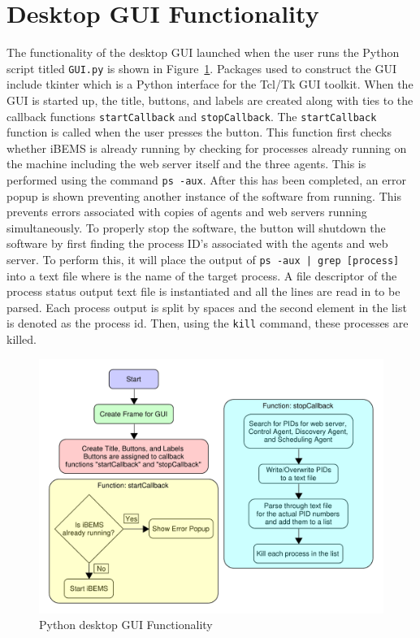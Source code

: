 \section{Desktop GUI Functionality}
The functionality of the desktop GUI launched when the user runs the Python script titled \texttt{GUI.py} is shown in Figure~\ref{fig:desktopgui}. Packages used to construct the GUI include tkinter which is a Python interface for the Tcl/Tk GUI toolkit. When the GUI is started up, the title, buttons, and labels are created along with ties to the callback functions \texttt{startCallback} and \texttt{stopCallback}. The \texttt{startCallback} function is called when the user presses the  button. This function first checks whether iBEMS is already running by checking for processes already running on the machine including the web server itself and the three agents. This is performed using the command \texttt{ps -aux}. After this has been completed, an error popup is shown preventing another instance of the software from running. This prevents errors associated with copies of agents and web servers running simultaneously. To properly stop the software, the  button will shutdown the software by first finding the process ID's associated with the agents and web server. To perform this, it will place the output of \texttt{ps -aux | grep [process]} into a text file where  is the name of the target process. A file descriptor of the process status output text file is instantiated and all the lines are read in to be parsed. Each process output is split by spaces and the second element in the list is denoted as the process id. Then, using the \texttt{kill} command, these processes are killed. 
\begin{figure}[H]
    \centering
    \includegraphics[scale=0.6]{figs/GUI_Diagram.pdf}
    \caption{Python desktop GUI Functionality}
    \label{fig:desktopgui}
\end{figure}

